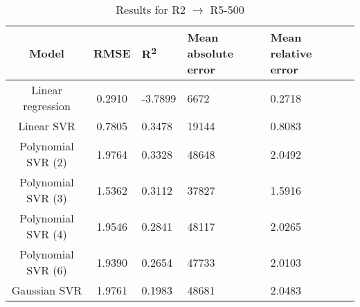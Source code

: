 \begin{table}[H]
\centering
\begin{adjustbox}{center}
\begin{tabular}{c | c M{1.2cm} M{2.5cm} M{2.5cm} M{1.8cm}}
Model & RMSE & R\textsuperscript{2} & Mean absolute error & Mean relative error \tabularnewline
\hline
Linear regression & 0.2910 & -3.7899 &   6672 & 0.2718 \\
Linear SVR & 0.7805 & 0.3478 &  19144 & 0.8083 \\
Polynomial SVR (2) & 1.9764 & 0.3328 &  48648 & 2.0492 \\
Polynomial SVR (3) & 1.5362 & 0.3112 &  37827 & 1.5916 \\
Polynomial SVR (4) & 1.9546 & 0.2841 &  48117 & 2.0265 \\
Polynomial SVR (6) & 1.9390 & 0.2654 &  47733 & 2.0103 \\
Gaussian SVR & 1.9761 & 0.1983 &  48681 & 2.0483 \\
\end{tabular}
\end{adjustbox}
\\
\caption{Results for R2 $\rightarrow$ R5-500}
\label{tab:coreonly_linear_R2_R5_500}
\end{table}
